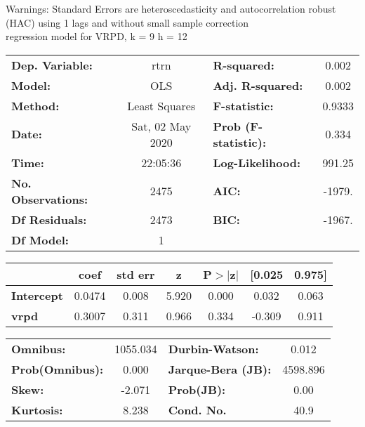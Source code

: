 Warnings: \newline
 [1] Standard Errors are heteroscedasticity and autocorrelation robust (HAC) using 1 lags and without small sample correction\\ 

regression model for VRPD, k = 9 h = 12\begin{center}
\begin{tabular}{lclc}
\toprule
\textbf{Dep. Variable:}    &       rtrn       & \textbf{  R-squared:         } &     0.002   \\
\textbf{Model:}            &       OLS        & \textbf{  Adj. R-squared:    } &     0.002   \\
\textbf{Method:}           &  Least Squares   & \textbf{  F-statistic:       } &    0.9333   \\
\textbf{Date:}             & Sat, 02 May 2020 & \textbf{  Prob (F-statistic):} &    0.334    \\
\textbf{Time:}             &     22:05:36     & \textbf{  Log-Likelihood:    } &    991.25   \\
\textbf{No. Observations:} &        2475      & \textbf{  AIC:               } &    -1979.   \\
\textbf{Df Residuals:}     &        2473      & \textbf{  BIC:               } &    -1967.   \\
\textbf{Df Model:}         &           1      & \textbf{                     } &             \\
\bottomrule
\end{tabular}
\begin{tabular}{lcccccc}
                   & \textbf{coef} & \textbf{std err} & \textbf{z} & \textbf{P$> |$z$|$} & \textbf{[0.025} & \textbf{0.975]}  \\
\midrule
\textbf{Intercept} &       0.0474  &        0.008     &     5.920  &         0.000        &        0.032    &        0.063     \\
\textbf{vrpd}      &       0.3007  &        0.311     &     0.966  &         0.334        &       -0.309    &        0.911     \\
\bottomrule
\end{tabular}
\begin{tabular}{lclc}
\textbf{Omnibus:}       & 1055.034 & \textbf{  Durbin-Watson:     } &    0.012  \\
\textbf{Prob(Omnibus):} &   0.000  & \textbf{  Jarque-Bera (JB):  } & 4598.896  \\
\textbf{Skew:}          &  -2.071  & \textbf{  Prob(JB):          } &     0.00  \\
\textbf{Kurtosis:}      &   8.238  & \textbf{  Cond. No.          } &     40.9  \\
\bottomrule
\end{tabular}
\end{center}

